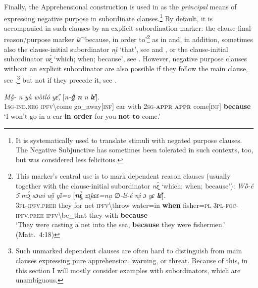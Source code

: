 \documentclass[output=paper,colorlinks,citecolor=brown]{langscibook}
\begin{document}
Finally, the Apprehensional construction is used in  as the \textit{principal} means of expressing negative purpose in subordinate clauses.\footnote{It is systematically used to translate stimuli with negated purpose clauses. The Negative Subjunctive has sometimes been tolerated in such contexts, too, but was considered less felicitous.} By default, it is accompanied in such clauses by an explicit subordination marker: the clause-final reason\slash purpose marker \textit{lɛ̌} `because, in order to'\footnote{This marker's central use is to mark dependent reason clauses (usually together with the clause-initial subordinator \textit{nɛ̰̀} `which; when; because'):
\ea \label{ex:Fedfootnote22}
\gll \textit{Wȍ-é} \textit{ɔ̏} \textit{mɔ̰́} \textit{sɔwi} \textit{wı̰̋} \textit{yi̋=o} \textup{[}\textit{\textbf{nɛ̰̀}} \textit{zɔ̰kɛɛ=nṵ} ∅\textit{-lí-é} \textit{nı̰́} \textit{ɔ} \textit{yɛ} \textit{\textbf{lɛ̌}}\textup{]}\textit{.} \\
\textsc{3pl-ipfv.preh} they for net \textsc{ipfv}\backslash throw water=in \textbf{when} fisher=\textsc{pl} \textsc{3pl-foc-ipfv.preh} \textsc{ipfv}\backslash be\_that they with \textbf{because} \\
\glt `They were casting a net into the sea, \textbf{because} they were fishermen.' (Matt.\ 4:18)
\z} as in  and, in addition, sometimes also the clause-initial subordinator \textit{nı̰́} `that', see  and , or the clause-initial subordinator \textit{nɛ̰̀} `which; when; because', see . However, negative purpose clauses without an explicit subordinator are also possible if they follow the main clause, see ,\footnote{Such unmarked dependent clauses are often hard to distinguish from main clauses expressing pure apprehension, warning, or threat. Because of this, in this section I will mostly consider examples with subordinators, which are unambiguous.} but not if they precede it, see .

\ea \label{ex:Fed55}
\gll \textit{Mȁ̰-{\à}} \textit{n{\ù}} \textit{yà} \textit{wȍtló} \textit{yɛ̋,} \textup{[}\textit{n-\textbf{a̰̋}} \textit{\textbf{n{\ù}}} \textit{n{\ù}} \textit{\textbf{lɛ̌}}\textup{]}\textit{.}\\
\textsc{1sg-ind.neg} \textsc{ipfv\backslash}come go\_away[\textsc{inf}] car with \textsc{2sg-\textbf{appr}} \textsc{\textbf{appr}} come[\textsc{inf}] \textbf{because} \\
\glt `I won't go in a car \textbf{in order} for you \textbf{not to} come.'
\z
\end{document}
